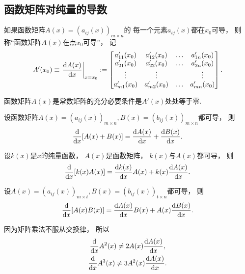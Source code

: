 \subsection{函数矩阵对纯量的导数}
\begin{definition}
如果函数矩阵\(A(x) = (a_{ij}(x))_{m \times n}\)的
每一个元素\(a_{ij}(x)\)都在\(x_0\)可导，
则称“函数矩阵\(A(x)\)在点\(x_0\)可导”，
记\begin{equation*}
	A'(x_0)
	\equiv \eval{\dv{A(x)}{x}}_{x=x_0}
	\defeq \begin{bmatrix}
		a_{11}'(x_0) & a_{12}'(x_0) & \dots & a_{1n}'(x_0) \\
		a_{21}'(x_0) & a_{22}'(x_0) & \dots & a_{2n}'(x_0) \\
		\vdots & \vdots & & \vdots \\
		a_{m1}'(x_0) & a_{m2}'(x_0) & \dots & a_{mn}'(x_0) \\
	\end{bmatrix}.
\end{equation*}
\end{definition}

\begin{property}
函数矩阵\(A(x)\)是常数矩阵的充分必要条件是\(A'(x)\)处处等于零.
\end{property}

\begin{property}
设函数矩阵\(
	A(x) = (a_{ij}(x))_{m \times n},
	B(x) = (b_{ij}(x))_{m \times n}
\)都可导，
则\begin{equation*}
	\dv{x} [ A(x) + B(x) ]
	= \dv{A(x)}{x} + \dv{B(x)}{x}.
\end{equation*}
\end{property}

\begin{property}
设\(k(x)\)是\(x\)的纯量函数，
\(A(x)\)是函数矩阵，
\(k(x)\)与\(A(x)\)都可导，
则\begin{equation*}
	\dv{x} [ k(x) A(x) ]
	= \dv{k(x)}{x} A(x)
	+ k(x) \dv{A(x)}{x}.
\end{equation*}
\end{property}

\begin{property}
设\(
	A(x) = (a_{ij}(x))_{m \times t},
	B(x) = (b_{ij}(x))_{t \times n}
\)都可导，
则\begin{equation*}
	\dv{x} [ A(x) B(x) ]
	= \dv{A(x)}{x} B(x)
	+ A(x) \dv{B(x)}{x}.
\end{equation*}
\end{property}
\begin{remark}
因为矩阵乘法不服从交换律，
所以\begin{gather*}
	\dv{x} A^2(x)
	\neq 2 A(x) \dv{A(x)}{x}, \\
	\dv{x} A^3(x)
	\neq 3 A^2(x) \dv{A(x)}{x}.
\end{gather*}
\end{remark}


